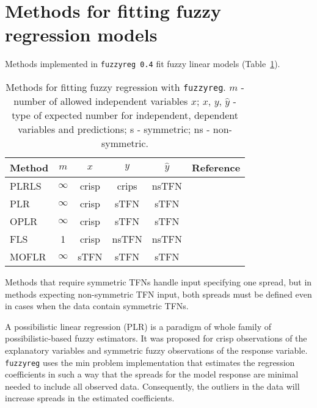 \documentclass[a4paper]{article}
\begin{document}
\section{Methods for fitting fuzzy regression models}

Methods implemented in \texttt{fuzzyreg 0.4} fit fuzzy linear models (Table~\ref{tab:methods}).

\begin{table}[h]
	\caption{Methods for fitting fuzzy regression with \texttt{fuzzyreg}.
	$m$ - number of allowed independent
	variables $x$; $x$, $y$, $\hat{y}$ - type of expected number for independent,
	dependent variables and predictions; s - symmetric; ns - non-symmetric.}
	\label{tab:methods}
	\begin{center}
	\begin{tabular}{lccccc}
		\hline
		Method	&	$m$			&	$x$		&	$y$		&	$\hat{y}$ & Reference\\ \hline
		PLRLS	&	$\infty$	&	crisp	&	crips	&	nsTFN     & \cite{ref:LeeTanaka1999}\\
		PLR		&	$\infty$	&	crisp	&	sTFN	&	sTFN      & \cite{ref:Tanaka1989}\\
		OPLR	&	$\infty$	&	crisp	&	sTFN	&	sTFN      & \cite{ref:Hung2006}\\
		FLS		&	1			&	crisp	&	nsTFN	&	nsTFN     & \cite{ref:Diamond1988}\\
		MOFLR	&	$\infty$	&	sTFN	&	sTFN	&	sTFN      & \cite{ref:Nasrabadi2005}\\
		\hline
	\end{tabular}
	\end{center}
\end{table}

Methods that require symmetric TFNs handle input specifying one spread, but in methods
expecting non-symmetric TFN input, both spreads must be defined even in cases when the
data contain symmetric TFNs.

A possibilistic linear regression (PLR) is a paradigm of whole family of possibilistic-based fuzzy
estimators. It was proposed for crisp observations of the explanatory variables and symmetric fuzzy
observations of the response variable. \texttt{fuzzyreg} uses the min problem implementation 
\cite{ref:Tanaka1989} that estimates the regression coefficients in such a way that the spreads for the model
response are minimal needed to include all observed data. Consequently, the outliers in the data will
increase spreads in the estimated coefficients.
\end{document}
